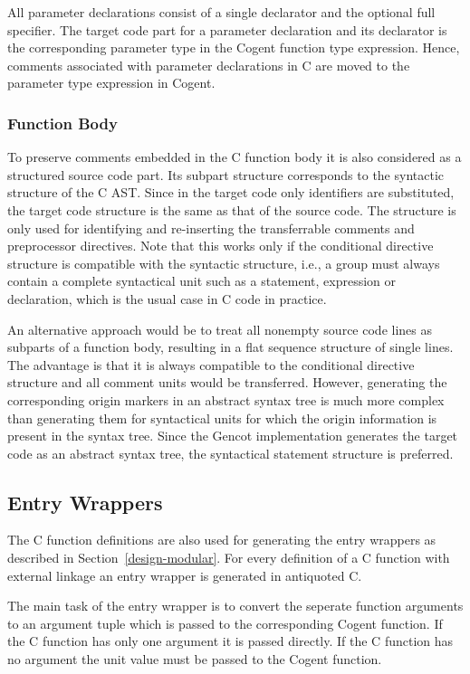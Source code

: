 All parameter declarations consist of a single declarator and the optional full specifier. The target code part for
a parameter declaration and its declarator is the corresponding parameter type in the Cogent function type expression.
Hence, comments associated with parameter declarations in C are moved to the parameter type expression in Cogent.

\subsubsection{Function Body}

To preserve comments embedded in the C function body it is also considered as a structured source code part. Its 
subpart structure corresponds to the syntactic structure of the C AST. Since in the target code only identifiers 
are substituted, the target code
structure is the same as that of the source code. The structure is only used for identifying and re-inserting
the transferrable comments and preprocessor directives. Note that this works only if the conditional directive 
structure is compatible with the syntactic structure, i.e., a group must always contain a complete syntactical
unit such as a statement, expression or declaration, which is the usual case in C code in practice.

An alternative approach would be to treat all nonempty source code lines as subparts of a function body, resulting
in a flat sequence structure of single lines. The advantage is that it is always compatible to the conditional 
directive structure and
all comment units would be transferred. However, generating the corresponding origin markers in an abstract syntax
tree is much more complex than generating them for syntactical units for which the origin information is present
in the syntax tree. Since the Gencot implementation generates the
target code as an abstract syntax tree, the syntactical statement structure is preferred. 

\subsection{Entry Wrappers}
\label{design-fundefs-wrapper}

The C function definitions are also used for generating the entry wrappers as described in Section~\ref{design-modular}.
For every definition of a C function with external linkage an entry wrapper is generated in antiquoted C.

The main task of the entry wrapper is to convert the seperate function arguments to an argument tuple which is passed
to the corresponding Cogent function. If the C function has only one argument it is passed directly. If the C 
function has no argument the unit value must be passed to the Cogent function.

